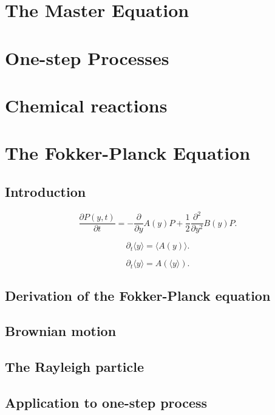 \documentclass{book}
\theoremstyle{plain}
\theoremstyle{definition}
\theoremstyle{remark}
\begin{document}
\chapter{The Master Equation}


\chapter{One-step Processes}


\chapter{Chemical reactions}


\chapter{The Fokker-Planck Equation}

\section{Introduction}

\begin{equation}
  \frac{ \partial P(y, t) }  { \partial t }
=
-\frac{\partial } {\partial y} A(y) P
+\frac{1}{2} \frac{ \partial^2 } { \partial y^2 } B(y) P.
\tag{1.1}
\end{equation}


\begin{equation}
\partial_t \langle y \rangle
= \langle A(y) \rangle.
\tag{1.7}
\end{equation}

$$
\partial_t \langle y \rangle
= A(\langle y \rangle).
$$

\section{Derivation of the Fokker-Planck equation}

\section{Brownian motion}

\section{The Rayleigh particle}

\section{Application to one-step process}
\end{document}

